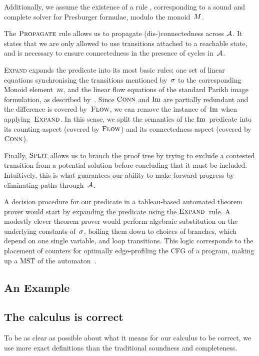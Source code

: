 \documentclass[acmsmall,review,anonymous]{acmart}\settopmatter{printfolios=true,printccs=false,printacmref=true}
\theoremstyle{definition}
\begin{document}
Additionally, we assume the existence of a rule \PresburgerClose{},
corresponding to a sound and complete solver for Presburger formulae, modulo the
monoid~$M$.

The $\textsc{Propagate}{}$ rule allows us to propagate (dis-)connectedness across
$\mathcal{A}$. It states that we are only allowed to use transitions attached to
a reachable state, and is necessary to ensure connectedness in the presence of
cycles in~$\mathcal{A}$.

\textsc{Expand} expands the predicate into its most basic rules; one set of
linear equations synchronising the transitions mentioned by~$\operatorname{\sigma}$ to the
corresponding Monoid element~$m$, and the linear flow equations of
the standard Parikh image formulation, as described by~\FlowEq. Since
$\operatorname{\textsc{Conn}}$ and $\operatorname{Im}$ are partially redundant and the difference is covered
by~$\textsc{Flow}$, we can remove the instance of~$\operatorname{Im}$ when applying~$\textsc{Expand}$. In
this sense, we split the semantics of the $\operatorname{Im}$~predicate into its counting
aspect (covered by $\textsc{Flow}$) and its connectedness aspect (covered by
$\operatorname{\textsc{Conn}}$).

Finally, $\textsc{Split}{}$ allows us to branch the proof tree by trying to exclude a
contested transition from a potential solution before concluding that it must be
included. Intuitively, this is what guarantees our ability to make forward
progress by eliminating paths through~$\mathcal{A}$.

A decision procedure for our predicate in a tableau-based automated theorem
prover would start by expanding the predicate using the $\textsc{Expand}{}$~rule. A
modestly clever theorem prover would perform algebraic substitution on the
underlying constants of~$\operatorname{\sigma}$, boiling them down to choices of branches,
which depend on one single variable, and loop transitions. This logic
corresponds to the placement of counters for optimally edge-profiling the CFG of
a program, making up a MST of the automaton~\cite{path-profiling}.

\subsection{An Example}

\subsection{The calculus is correct}

To be as clear as possible about what it means for our calculus to be correct,
we use more exact definitions than the traditional soundness and completeness.
\end{document}
